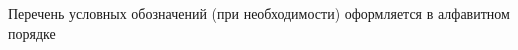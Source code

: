 \label{sec:reduction}

Перечень условных обозначений (при необходимости) оформляется в алфавитном порядке

